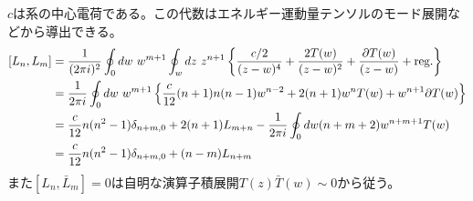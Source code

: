 \documentclass[11pt, aps, longbibliography]{article}
\numberwithin{equation}{section}
\begin{document}
        $c$は系の中心電荷である。この代数はエネルギー運動量テンソルのモード展開などから導出できる。
        \begin{align}\label{eq:virasoro7}
            [L_n, L_m] &= \frac{1}{(2\pi i)^2} \oint_0 dw\ w^{m+1} \oint_w dz \ z^{n+1} \left\{ \frac{c/2}{(z-w)^4} + \frac{2T(w)}{(z-w)^2} + \frac{\partial T(w)}{(z-w)} + \text{reg.} \right\} \notag \\
            &= \frac{1}{2\pi i} \oint_0 dw\ w^{m+1}\left\{ \frac{c}{12}(n+1)n(n-1)w^{n-2} + 2(n+1)w^nT(w) + w^{n+1}\partial T(w) \right\} \notag \\
            &= \frac{c}{12}n(n^2-1)\delta_{n+m, 0} + 2(n+1)L_{m+n} - \frac{1}{2\pi i}\oint_0 dw (n+m+2)w^{n+m+1}T(w) \notag \\
            &= \frac{c}{12}n(n^2-1)\delta_{n+m, 0} + (n-m)L_{n+m}
        \end{align}
        また$[L_n, \bar{L}_m] = 0$は自明な演算子積展開$T(z)\bar{T}(w)\sim 0$から従う。
\end{document}
